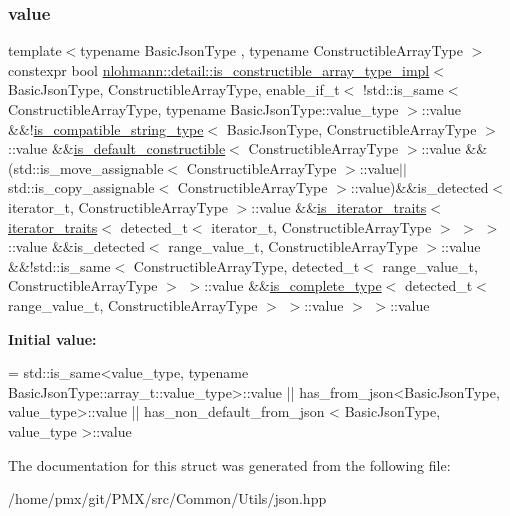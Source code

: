\subsubsection{\texorpdfstring{value}{value}}
{\footnotesize\ttfamily template$<$typename Basic\+Json\+Type , typename Constructible\+Array\+Type $>$ \\
constexpr bool \hyperlink{structnlohmann_1_1detail_1_1is__constructible__array__type__impl}{nlohmann\+::detail\+::is\+\_\+constructible\+\_\+array\+\_\+type\+\_\+impl}$<$ Basic\+Json\+Type, Constructible\+Array\+Type, enable\+\_\+if\+\_\+t$<$ !std\+::is\+\_\+same$<$ Constructible\+Array\+Type, typename Basic\+Json\+Type\+::value\+\_\+type $>$\+::value \&\&!\hyperlink{structnlohmann_1_1detail_1_1is__compatible__string__type}{is\+\_\+compatible\+\_\+string\+\_\+type}$<$ Basic\+Json\+Type, Constructible\+Array\+Type $>$\+::value \&\&\hyperlink{structnlohmann_1_1detail_1_1is__default__constructible}{is\+\_\+default\+\_\+constructible}$<$ Constructible\+Array\+Type $>$\+::value \&\&(std\+::is\+\_\+move\+\_\+assignable$<$ Constructible\+Array\+Type $>$\+::value$\vert$$\vert$std\+::is\+\_\+copy\+\_\+assignable$<$ Constructible\+Array\+Type $>$\+::value)\&\&is\+\_\+detected$<$ iterator\+\_\+t, Constructible\+Array\+Type $>$\+::value \&\&\hyperlink{structnlohmann_1_1detail_1_1is__iterator__traits}{is\+\_\+iterator\+\_\+traits}$<$ \hyperlink{structnlohmann_1_1detail_1_1iterator__traits}{iterator\+\_\+traits}$<$ detected\+\_\+t$<$ iterator\+\_\+t, Constructible\+Array\+Type $>$ $>$ $>$\+::value \&\&is\+\_\+detected$<$ range\+\_\+value\+\_\+t, Constructible\+Array\+Type $>$\+::value \&\&!std\+::is\+\_\+same$<$ Constructible\+Array\+Type, detected\+\_\+t$<$ range\+\_\+value\+\_\+t, Constructible\+Array\+Type $>$ $>$\+::value \&\&\hyperlink{structnlohmann_1_1detail_1_1is__complete__type}{is\+\_\+complete\+\_\+type}$<$ detected\+\_\+t$<$ range\+\_\+value\+\_\+t, Constructible\+Array\+Type $>$ $>$\+::value $>$ $>$\+::value\hspace{0.3cm}{\ttfamily [static]}}

{\bfseries Initial value\+:}
\begin{DoxyCode}
=
        std::is\_same<value\_type,
        \textcolor{keyword}{typename} BasicJsonType::array\_t::value\_type>::value ||
        has\_from\_json<BasicJsonType,
        value\_type>::value ||
        has\_non\_default\_from\_json <
        BasicJsonType,
        value\_type >::value
\end{DoxyCode}


The documentation for this struct was generated from the following file\+:\begin{DoxyCompactItemize}
\item 
/home/pmx/git/\+P\+M\+X/src/\+Common/\+Utils/json.\+hpp\end{DoxyCompactItemize}
